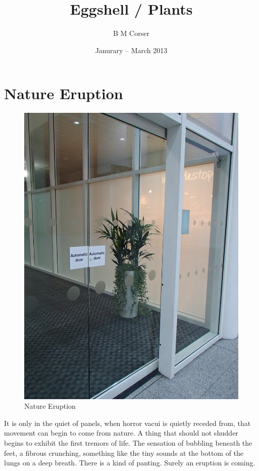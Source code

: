 \documentclass{book}
\title{Eggshell / Plants}
\author{B M Corser}
\date{Janurary -- March 2013}
\begin{document}
\maketitle

\tableofcontents

\chapter{Nature Eruption}

\begin{figure}
\centering
\includegraphics[width=\textwidth,angle=90]{figures/P1050140.JPG}
\caption{Nature Eruption}
\end{figure}

It is only in the quiet of panels, when horror vacui is quietly receded from,
that movement can begin to come from nature. A thing that should not shudder
begins to exhibit the first tremors of life. The sensation of bubbling beneath
the feet, a fibrous crunching, something like the tiny sounds at the bottom of
the lungs on a deep breath. There is a kind of panting. Surely an eruption is
coming.
\end{document}
